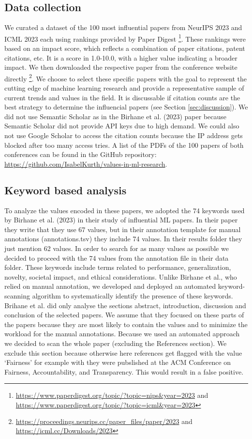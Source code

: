 \documentclass{article}
\begin{document}
\subsection{Data collection}
We curated a dataset of the 100 most influential papers from NeurIPS 2023 and ICML 2023 each using rankings provided by Paper Digest 
\footnote{\url{https://www.paperdigest.org/topic/?topic=nips&year=2023} and \url{https://www.paperdigest.org/topic/?topic=icml&year=2023}}. 
These rankings were based on an impact score, which reflects a combination of paper citations, patent citations, etc. It is a score in 1.0-10.0, 
with a higher value indicating a broader impact. We then downloaded the respective paper from the conference website directly 
\footnote{\url{https://proceedings.neurips.cc/paper_files/paper/2023} and \url{https://icml.cc/Downloads/2023}}. 
We choose to select these specific papers with the goal to represent the cutting edge of machine 
learning research and provide a representative sample of current trends and values in the field. It is discussable if citation counts are the best strategy to determine the influencial papers (see Section \ref{sec:discussion}). 
We did not use Semantic Scholar as in the Birhane et 
al. (2023) paper because Semantic Scholar did not provide API keys due to high demand. We could also not use Google Scholar to access the citation 
counts because the IP address gets blocked after too many access tries. A list of the PDFs of the 100 papers of both conferences can be found in the 
GitHub repository: \url{https://github.com/IsabelKurth/values-in-ml-research}.

\subsection{Keyword based analysis}
To analyze the values encoded in these papers, we adopted the 74 keywords used by Birhane et al. (2023) in their study of influential ML papers. In their paper
they write that they use 67 values, but in their annotation template for manual annotations (annotations.tsv) they include 74 values. In their results folder they
just mention 62 values. In order to search for as many values as possible we decided to proceed with the 74 values from the annotation file in their data folder.  
These keywords include terms related to performance, generalization, novelty, societal impact, and ethical considerations. 
Unlike Birhane et al., who relied on manual annotation, we developed and deployed an automated keyword-scanning algorithm to systematically identify the presence of 
these keywords. Brihane et al. did only analyse the sections abstract, introduction, discussion and conclusion of the selected papers. We assume that they focused on these parts of the papers because they are most likely to contain the values and to minimize the workload for the manual annotations. Because we used an automated approach we decided to scan the whole paper (excluding the References section). We exclude this section because otherwise here references get flagged with the value `Fairness' for example with they were pubslished at the ACM Conference on Fairness, Accountability, and Transparency. This would result in a false positive.
\end{document}
